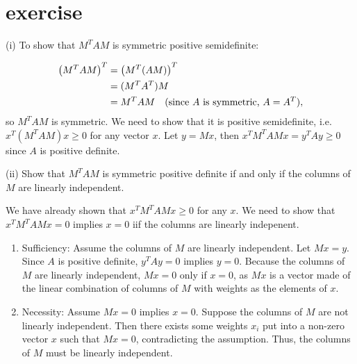 \documentclass{article}
\begin{document}
\section{exercise}
 (i) To show that \( M^TAM \) is symmetric positive semidefinite:

\begin{align*}
    \left(M^T A M\right)^T & = \left(M^T (A M)\right)^T                                           \\
                           & = (M^T A^T) M                                                        \\
                           & = M^T A M \quad \text{(since \( A \) is symmetric, \( A = A^T \))} , \\
\end{align*}
so \( M^TAM \) is symmetric.
We need to show that it is positive semidefinite, i.e.
\( x^T (M^T A M) x \geq 0 \)  for any vector $x$. Let $y = Mx$, then
$x^T M^T A M x =  y^T A y \geq 0$ since $A$ is positive definite.

\vspace{0.5cm}
(ii) \quad Show that \( M^TAM \) is symmetric positive definite if and only if
the columns of \( M \) are linearly independent.

We have already shown that \( x^T M^T A M x \geq 0 \) for any \( x \).
We need to show that \( x^T M^T A M x = 0 \) implies \( x = 0 \) iif the columns are linearly indepenent.

\begin{enumerate}
    \item Sufficiency:
          Assume the columns of \( M \) are linearly independent.
          Let \( Mx = y \). Since \( A \) is positive definite, \( y^T A y = 0 \) implies \( y = 0 \).
          Because the columns of \( M \) are linearly independent, \( Mx = 0 \) only if \( x = 0 \),
          as $Mx$ is a vector made of the linear combination of columns of $M$ with weights as the elements of $x$.

    \item Necessity:
          Assume \( Mx = 0 \) implies \( x = 0 \).
          Suppose the columns of \( M \) are not linearly independent.
          Then there exists some weights $x_i$ put into a non-zero vector $x$
          such that \( Mx = 0 \), contradicting the assumption.
          Thus, the columns of \( M \) must be linearly independent.
\end{enumerate}
\end{document}
